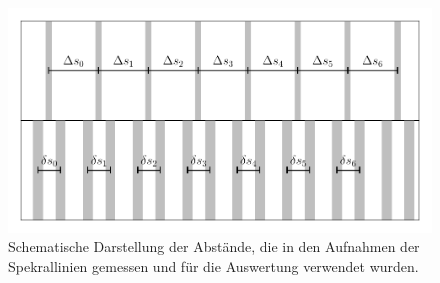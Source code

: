 \FloatBarrier
\begin{figure}[!h]
\centering
\includegraphics[scale=0.8]{../Grafiken/Messmethode.pdf}
\caption{Schematische Darstellung der Abstände, die in den Aufnahmen der Spekrallinien
        gemessen und für die Auswertung verwendet wurden.\label{fig:messmethode}}
\end{figure}
\FloatBarrier
